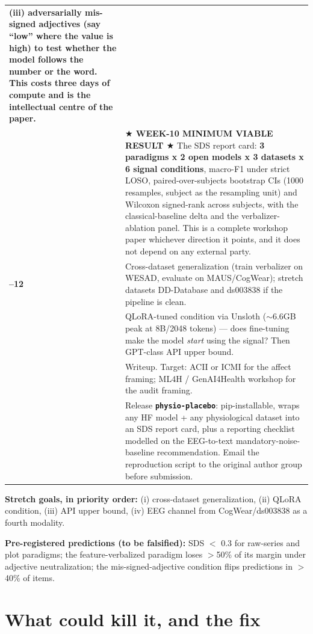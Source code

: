 \documentclass[11pt]{article}
\begin{document}
\begin{longtable}{@{}>{\bfseries\RaggedRight}p{}L{0.865\textwidth}@{}}
(iii) \textbf{adversarially mis-signed adjectives} (say ``low'' where the
value is high) to test whether the model follows the number or the word. This
costs three days of compute and is the intellectual centre of the paper.\\
 & \textbf{$\bigstar$ WEEK-10 MINIMUM VIABLE RESULT $\bigstar$} The SDS
report card: \textbf{3 paradigms x 2 open models x 3 datasets x 6 signal
conditions}, macro-F1 under strict LOSO, paired-over-subjects bootstrap CIs
(1000 resamples, subject as the resampling unit) and Wilcoxon signed-rank
across subjects, with the classical-baseline delta and the verbalizer-ablation
panel. This is a complete workshop paper whichever direction it points, and it
does not depend on any external party.\\
--12 & Cross-dataset generalization (train verbalizer on WESAD, evaluate on
MAUS/CogWear); stretch datasets DD-Database and ds003838 if the pipeline is
clean.\\
 & QLoRA-tuned condition via Unsloth ($\sim$6.6GB peak at 8B/2048 tokens)
--- does fine-tuning make the model \emph{start} using the signal? Then
GPT-class API upper bound.\\
 & Writeup. Target: ACII or ICMI for the affect framing; ML4H /
GenAI4Health workshop for the audit framing.\\
 & Release \textbf{\texttt{physio-placebo}}: pip-installable, wraps any HF
model + any physiological dataset into an SDS report card, plus a reporting
checklist modelled on the EEG-to-text mandatory-noise-baseline recommendation.
Email the reproduction script to the original author group before
submission.\\
\end{longtable}

\textbf{Stretch goals, in priority order:} (i) cross-dataset generalization,
(ii) QLoRA condition, (iii) API upper bound, (iv) EEG channel from
CogWear/ds003838 as a fourth modality.

\textbf{Pre-registered predictions (to be falsified):} SDS $<$ 0.3 for
raw-series and plot paradigms; the feature-verbalized paradigm loses
$>$50\% of its margin under adjective neutralization; the mis-signed-adjective
condition flips predictions in $>$40\% of items.

\section{What could kill it, and the fix}
\end{document}
